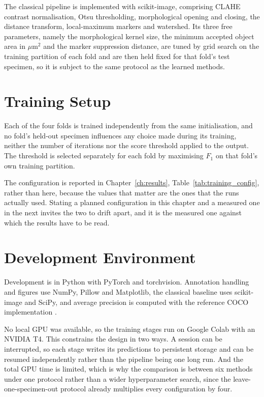The classical pipeline is implemented with scikit-image, comprising CLAHE contrast
normalisation, Otsu thresholding, morphological opening and closing, the distance
transform, local-maximum markers and watershed. Its three free parameters, namely
the morphological kernel size, the minimum accepted object area in $\mu$m$^2$ and
the marker suppression distance, are tuned by grid search on the training partition
of each fold and are then held fixed for that fold's test specimen, so it is
subject to the same protocol as the learned methods.

\section{Training Setup}

Each of the four folds is trained independently from the same initialisation, and no
fold's held-out specimen influences any choice made during its training, neither the
number of iterations nor the score threshold applied to the output. The threshold is
selected separately for each fold by maximising $F_1$ on that fold's own training
partition.

The configuration is reported in Chapter~\ref{ch:results},
Table~\ref{tab:training_config}, rather than here, because the values that matter
are the ones that the runs actually used. Stating a planned configuration in this
chapter and a measured one in the next invites the two to drift apart, and it is the
measured one against which the results have to be read.

\section{Development Environment}
\label{sec:environment}

Development is in Python with PyTorch \cite{paszke2019pytorch} and torchvision.
Annotation handling and figures use NumPy, Pillow and Matplotlib, the classical
baseline uses scikit-image \cite{vanderwalt2014scikit} and SciPy, and average
precision is computed with the reference COCO implementation
\cite{lin2014microsoft}.

No local GPU was available, so the training stages run on Google Colab with an
NVIDIA T4. This constrains the design in two ways. A session can be interrupted,
so each stage writes its predictions to persistent storage and can be resumed
independently rather than the pipeline being one long run. And the total GPU time
is limited, which is why the comparison is between six methods under one protocol
rather than a wider hyperparameter search, since the leave-one-specimen-out
protocol already multiplies every configuration by four.

